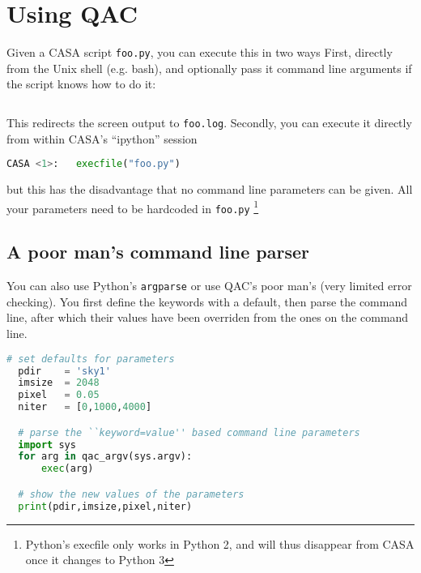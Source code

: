 \documentclass[12pt,a4paper]{article}
\begin{document}
\section{Using QAC}

Given a CASA script \verb+foo.py+, you can execute this in two ways
First, directly from the Unix shell (e.g. bash), and optionally
pass it command line arguments if the script knows how to do it:
 
\begin{lstlisting}[language=bash]
    % casa --nogui -c foo.py pixel=0.1 > foo.log 2>&1
\end{lstlisting}

This redirects the screen output to \verb+foo.log+.  Secondly, you can execute it directly from within CASA's ``ipython'' session

\begin{lstlisting}[language=Python]
CASA <1>:   execfile("foo.py")
\end{lstlisting}

but this has the disadvantage that no command line parameters can be given. All your parameters need to be hardcoded
in \verb+foo.py+ \footnote{Python's execfile only works in Python 2, and will thus disappear from CASA once it changes to Python 3}



\subsection{A poor man's command line parser}

You can also use Python's {\tt argparse} or use QAC's poor man's (very limited error checking).  You first define
the keywords with a default, then parse the command line, after which their values have been overriden from the ones on
the command line.

\begin{lstlisting}[language=Python]
  # set defaults for parameters
  pdir    = 'sky1'
  imsize  = 2048
  pixel   = 0.05
  niter   = [0,1000,4000]

  # parse the ``keyword=value'' based command line parameters
  import sys
  for arg in qac_argv(sys.argv):   
      exec(arg)

  # show the new values of the parameters
  print(pdir,imsize,pixel,niter)

\end{lstlisting}
\end{document}
